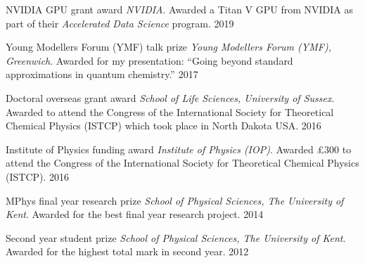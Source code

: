 



\begin{cvhonors}

\cvhonor
{NVIDIA GPU grant award} %
{\textit{NVIDIA}. Awarded a Titan V GPU from NVIDIA as part of their \textit{Accelerated Data Science} program.} %
{} %
{2019} %


\cvhonor
{Young Modellers Forum (YMF) talk prize} %
{\textit{Young Modellers Forum (YMF), Greenwich}. Awarded for my presentation: “Going beyond standard approximations in quantum chemistry.”} %
{} %
{2017} %


\cvhonor
{Doctoral overseas grant award} %
{\textit{School of Life Sciences, University of Sussex}. Awarded  to attend the  Congress of the International Society for Theoretical Chemical Physics (ISTCP) which took place in North Dakota USA.} %
{} %
{2016} %


\cvhonor
{Institute of Physics funding award} %
{\textit{Institute of Physics (IOP)}. Awarded \pounds 300 to attend the  Congress of the International Society for Theoretical Chemical Physics (ISTCP).} %
{} %
{2016} %


\cvhonor
{MPhys final year research prize} %
{\textit{School of Physical Sciences, The University of Kent}. Awarded for the best final year research project.} %
{} %
{2014} %


\cvhonor
{Second year student prize} %
{\textit{School of Physical Sciences, The University of Kent}. Awarded for the highest total mark in second year.} %
{} %
{2012} %

\end{cvhonors}
